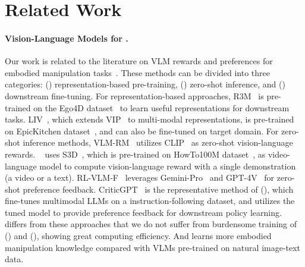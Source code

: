 \section{Related Work}
\paragraph{Vision-Language Models for \RL.}

Our work is related to the literature on VLM rewards and preferences for embodied manipulation tasks~\citep{CLIP, R3M, LIV, VLM-RM, RL-VLM-F, CriticGPT}. These methods can be divided into three categories: () representation-based pre-training, () zero-shot inference, and () downstream fine-tuning.
For representation-based approaches, R3M~\citep{R3M} is pre-trained on the Ego4D dataset~\citep{Ego4D} to learn useful representations for downstream tasks. LIV~\citep{VIP}, which extends VIP~\citep{VIP} to multi-modal representations, is pre-trained on EpicKitchen dataset~\citep{EpicKitchen}, and can also be fine-tuned on target domain.
For zero-shot inference methods, VLM-RM~\citep{VLM-RM} utilizes CLIP~\citep{CLIP} as zero-shot vision-language rewards.
\RC~\citep{RoboCLIP} uses S3D~\citep{S3D}, which is pre-trained on HowTo100M dataset~\citep{HowTo100M}, as video-language model to compute vision-language reward with a single demonstration (a video or a text).
RL-VLM-F~\citep{RL-VLM-F} leverages Gemini-Pro~\citep{Gemini} and GPT-4V~\citep{GPT-4V} for zero-shot preference feedback.
CriticGPT~\citep{CriticGPT} is the representative method of (), which fine-tunes multimodal LLMs on a instruction-following dataset, and utilizes the tuned model to provide preference feedback for downstream policy learning.
\ourmethod differs from these approaches that we do not suffer from burdensome training of () and (), showing great computing efficiency. And \ourmethod learns more embodied manipulation knowledge compared with VLMs pre-trained on natural image-text data.


